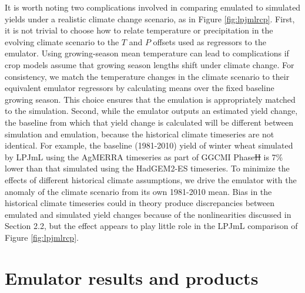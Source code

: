 \documentclass[gmdd]{copernicus} %
\providecommand{\DIFadd}[1]{{\protect\color{blue}\uwave{#1}}} %
\providecommand{\DIFdel}[1]{{\protect\color{red}\sout{#1}}}                      %
\providecommand{\DIFaddbegin}{} %
\providecommand{\DIFaddend}{} %
\providecommand{\DIFdelbegin}{} %
\providecommand{\DIFdelend}{} %
\begin{document}
It is worth noting two complications involved in comparing emulated to simulated yields under a realistic climate change scenario, as in Figure \ref{fig:lpjmlrcp}.
First, it is not trivial to choose how to relate temperature or precipitation in the evolving climate scenario to the $T$ and $P$ offsets used as regressors to the emulator. 
Using growing-season mean temperature can lead to complications if crop models assume that growing season lengths shift under climate change. 
For consistency, we match the temperature changes in the climate scenario to their equivalent emulator regressors by calculating means over the fixed baseline growing season. 
This choice ensures that the emulation is appropriately matched to the simulation.
Second, while the emulator outputs an estimated yield change, the baseline from which that yield change is calculated will be different between simulation and emulation, because the historical climate timeseries are not identical. For example, the baseline (1981-2010) yield of winter wheat simulated by LPJmL using the AgMERRA timeseries as part of GGCMI Phase\DIFdelbegin \DIFdel{II }\DIFdelend \DIFaddbegin \DIFadd{~2 }\DIFaddend is 7\% lower than that simulated using the HadGEM2-ES timeseries. 
To minimize the effects of different historical climate assumptions, we drive the emulator with the anomaly of the climate scenario from its own 1981-2010 mean. 
Bias in the historical climate timeseries could in theory produce discrepancies between emulated and simulated yield changes because of the nonlinearities discussed in Section 2.2, but the effect appears to play little role in the LPJmL comparison of Figure \ref{fig:lpjmlrcp}. 

\section{Emulator results and products}
\label{S:5}
\end{document}
